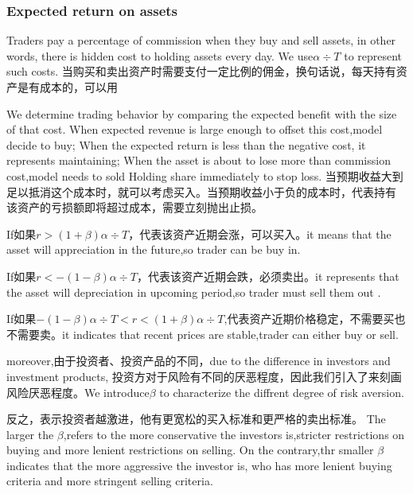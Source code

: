 \documentclass{mcmthesis}
\begin{document}


\subsubsection{Expected return on assets}
Traders pay a percentage of commission when they buy and sell assets, in other words, there is hidden cost to holding assets every day.
We use$\alpha \div T$ to represent such costs.
当购买和卖出资产时需要支付一定比例的佣金，换句话说，每天持有资产是有成本的，可以用%

We determine trading behavior by comparing the expected benefit with the size of that cost.
When expected revenue is large enough to offset this cost,model decide to buy;
When the expected return is less than the negative cost, it represents maintaining;
When the asset is about to lose more than commission cost,model needs to sold Holding share immediately to stop loss.
当预期收益大到足以抵消这个成本时，就可以考虑买入。当预期收益小于负的成本时，代表持有
该资产的亏损额即将超过成本，需要立刻抛出止损。

If如果$r>(1+\beta )\alpha \div T$，代表该资产近期会涨，可以买入。it means that the asset will appreciation in the future,so trader can be buy in.

If如果$r<-(1-\beta )\alpha \div T$，代表该资产近期会跌，必须卖出。it represents that the asset will depreciation in upcoming period,so trader must sell them out .

If如果$-(1-\beta )\alpha \div T<r<(1+\beta )\alpha \div T$,代表资产近期价格稳定，不需要买也不需要卖。it indicates that recent prices are stable,trader can either buy or sell.


moreover,由于投资者、投资产品的不同，due to the difference in investors and investment products,
投资方对于风险有不同的厌恶程度，因此我们引入了来刻画风险厌恶程度。We introduce$\beta $ to characterize the diffrent degree of risk aversion.

反之，表示投资者越激进，他有更宽松的买入标准和更严格的卖出标准。
The larger the $\beta $,refers to the more conservative the investors is,stricter restrictions on buying and more lenient restrictions on selling.
On the contrary,thr smaller $\beta $ indicates that the more aggressive the investor is, who has more lenient buying criteria and more stringent selling criteria.
\end{document}
